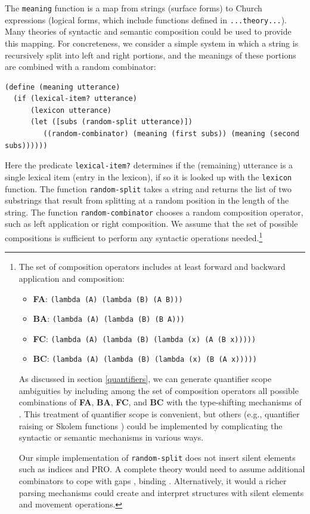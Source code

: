 \documentclass[12pt]{article}
\begin{document}
The \lstinline{meaning} function is a map from strings (surface forms) to Church expressions (logical forms, which include functions defined in \lstinline{...theory...}).
Many theories of syntactic and semantic composition could be used to provide this mapping. 
For concreteness, we consider a simple system in which a string is recursively split into left and right portions, and the meanings of these portions are combined with a random combinator:
\begin{lstlisting}
(define (meaning utterance)
  (if (lexical-item? utterance)
      (lexicon utterance)
      (let ([subs (random-split utterance)])
         ((random-combinator) (meaning (first subs)) (meaning (second subs))))))
\end{lstlisting}
Here the predicate \lstinline{lexical-item?} determines if the (remaining) utterance is a single lexical item (entry in the lexicon), if so it is looked up with the \lstinline{lexicon} function.
The function \lstinline{random-split} takes a string and returns the list of two substrings that result from splitting at a random position in the length of the string.
The function \lstinline{random-combinator} chooses a random composition operator, such as left application or right composition. 
We assume that the set of possible compositions is sufficient to perform any syntactic operations needed.\footnote{\label{composition}The set of composition operators includes at least forward and backward application and composition:
\begin{itemize}
\item \textbf{FA}: \lstinline{(lambda (A) (lambda (B) (A B)))}
\item \textbf{BA}: \lstinline{(lambda (A) (lambda (B) (B A)))}
\item \textbf{FC}: \lstinline{(lambda (A) (lambda (B) (lambda (x) (A (B x)))))}
\item \textbf{BC}: \lstinline{(lambda (A) (lambda (B) (lambda (x) (B (A x)))))}
\end{itemize}
As discussed in section \ref{quantifiers}, we can generate quantifier scope ambiguities by including among the set of composition operators all possible combinations of \textbf{FA}, \textbf{BA}, \textbf{FC}, and \textbf{BC} with the type-shifting mechanisms of \citet{hendriks93}. 
This treatment of quantifier scope is convenient, but others (e.g., quantifier raising or Skolem functions \cite{steedman12} ) could be implemented by complicating the syntactic or semantic mechanisms in various ways. 

Our simple implementation of \lstinline{random-split} does not insert silent elements such as indices and PRO. 
A complete theory would need to assume additional combinators to cope with gaps \citep{steedman00}, binding \citep{jacobson99,barker05}. 
Alternatively, it would a richer parsing mechanisms could create and interpret structures with silent elements and movement operations.}
\end{document}

